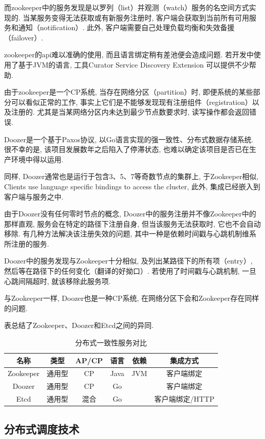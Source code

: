 \documentclass[UTF8,a4paper]{ctexart}
\begin{document}
而zookeeper中的服务发现是以罗列（list）并观测（watch）服务的名空间方式实现的. 当某服务变得无法获取或有新服务注册时, 客户端会获取到当前所有可用服务和通知（notification）. 此外, 客户端需要自己处理负载均衡和失效备援（failover）.

zookeeper的api难以准确的使用, 而且语言绑定稍有差池便会造成问题. 若开发中使用了基于JVM的语言, 工具Curator Service Discovery Extension 可以提供不少帮助.

由于zookeeper是一个CP系统, 当存在网络分区（partition）时, 即便系统的某些部分可以看似正常的工作, 事实上它们是不能够发现现有注册组件（registration）以及注册的. 尤其是当某网络分区内未达到最少节点数要求时, 读写操作都会返回错误.

Doozer是一个基于Paxos协议, 以Go语言实现的强一致性、分布式数据存储系统. 很不幸的是, 该项目发展数年之后陷入了停滞状态, 也难以确定该项目是否已在生产环境中得以运用.

同样, Doozer通常也是运行于包含3、5、7等奇数节点的集群上, 于Zookeeper相似, Clients use language specific bindings to access the cluster, 此外, 集成已经嵌入到客户端与服务之中.

由于Doozer没有任何零时节点的概念, Doozer中的服务注册并不像Zookeeper中的那样直观, 服务会在特定的路径下注册自身, 但当该服务无法获取时, 它也不会自动移除. 有几种方法解决该注册失效的问题, 其中一种是依赖时间戳与心跳机制维系所注册的服务.

Doozer中的服务发现与Zookeeper十分相似, 及列出某路径下的所有项（entry）, 然后等在路径下的任何变化（翻译的好拗口）. 若使用了时间戳与心跳机制, 一旦心跳间隔超时, 就该移除此服务项.

与Zookeeper一样, Doozer也是一种CP系统, 在网络分区下会和Zookeeper存在同样的问题.

表总结了Zookeeper、Doozer和Etcd之间的异同.
\begin{table}[!hbp]
    \centering
    \begin{tabular}{c|c|c|c|c|c}
    名称& 类型& AP/CP& 语言& 依赖& 集成方式 \\
    \hline
    Zookeeper& 通用型& CP&  Java& JVM& 客户端绑定 \\
    Doozer& 通用型& CP& Go& & 客户端绑定 \\
    Etcd& 通用型& 混合& Go& & 客户端绑定/HTTP \\
    \end{tabular}
    \caption{分布式一致性服务对比}
\end{table}

\subsection{分布式调度技术}
\end{document}
